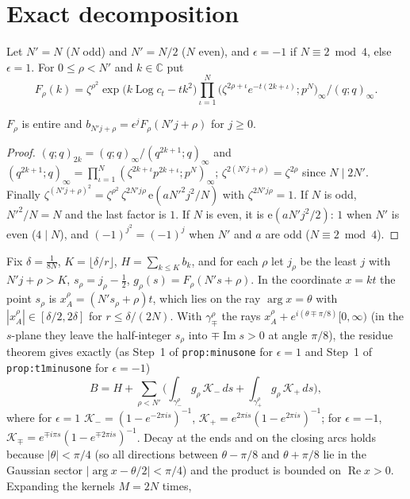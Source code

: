 \documentclass[11pt]{article}
\theoremstyle{definition}\newtheorem{definition}[theorem]{Definition}
\theoremstyle{remark}\newtheorem{remark}[theorem]{Remark}
\newcommand{\e}{\mathrm{e}}
\begin{document}
\section{Exact decomposition}\label{sec:dec}
Let $N'=N$ ($N$ odd) and $N'=N/2$ ($N$ even), and $\epsilon=-1$ if $N\equiv2\bmod4$, else $\epsilon=1$. For $0\le\rho<N'$ and $k\in\mathbb C$ put
\[F_\rho(k)=\zeta^{\rho^2}\exp\big(k\operatorname{Log}c_t-tk^2\big)\prod_{\iota=1}^{N}\big(\zeta^{2\rho+\iota}e^{-t(2k+\iota)};p^N\big)_\infty\Big/(q;q)_\infty .\]
\begin{lemma}[PROVED]\label{lem:classes}
$F_\rho$ is entire and $b_{N'j+\rho}=\epsilon^jF_\rho(N'j+\rho)$ for $j\ge0$.
\end{lemma}
\begin{proof}
$(q;q)_{2k}=(q;q)_\infty/(q^{2k+1};q)_\infty$ and $(q^{2k+1};q)_\infty=\prod_{\iota=1}^N(\zeta^{2k+\iota}p^{2k+\iota};p^N)_\infty$; $\zeta^{2(N'j+\rho)}=\zeta^{2\rho}$ since $N\mid2N'$. Finally $\zeta^{(N'j+\rho)^2}=\zeta^{\rho^2}\,\zeta^{2N'j\rho}\,\e(aN'^2j^2/N)$ with $\zeta^{2N'j\rho}=1$. If $N$ is odd, $N'^2/N=N$ and the last factor is $1$. If $N$ is even, it is $\e(aN'j^2/2)$: $1$ when $N'$ is even ($4\mid N$), and $(-1)^{j^2}=(-1)^j$ when $N'$ and $a$ are odd ($N\equiv2\bmod4$).
\end{proof}
Fix $\delta=\frac1{8N}$, $K=\lfloor\delta/r\rfloor$, $H=\sum_{k\le K}b_k$, and for each $\rho$ let $j_\rho$ be the least $j$ with $N'j+\rho>K$, $s_\rho=j_\rho-\frac12$, $g_\rho(s)=F_\rho(N's+\rho)$. In the coordinate $x=kt$ the point $s_\rho$ is $x_A^\rho=(N's_\rho+\rho)t$, which lies on the ray $\arg x=\theta$ with $|x_A^\rho|\in[\delta/2,2\delta]$ for $r\le\delta/(2N)$.
With $\gamma_\mp^\rho$ the rays $x_A^\rho+e^{i(\theta\mp\pi/8)}[0,\infty)$ (in the $s$-plane they leave the half-integer $s_\rho$ into $\mp\operatorname{Im}s>0$ at angle $\pi/8$), the residue theorem gives exactly (as Step~1 of \texttt{prop:minusone} for $\epsilon=1$ and Step~1 of \texttt{prop:t1minusone} for $\epsilon=-1$)
\[B=H+\sum_{\rho<N'}\Big(\int_{\gamma_-^\rho}g_\rho\,\mathcal K_-\,ds+\int_{\gamma_+^\rho}g_\rho\,\mathcal K_+\,ds\Big),\]
where for $\epsilon=1$ $\mathcal K_-=(1-e^{-2\pi is})^{-1}$, $\mathcal K_+=e^{2\pi is}(1-e^{2\pi is})^{-1}$; for $\epsilon=-1$, $\mathcal K_\mp=e^{\mp i\pi s}(1-e^{\mp2\pi is})^{-1}$. Decay at the ends and on the closing arcs holds because $|\theta|<\pi/4$ (so all directions between $\theta-\pi/8$ and $\theta+\pi/8$ lie in the Gaussian sector $|\arg x-\theta/2|<\pi/4$) and the product is bounded on $\operatorname{Re}x>0$.
Expanding the kernels $M=2N$ times,
\end{document}
